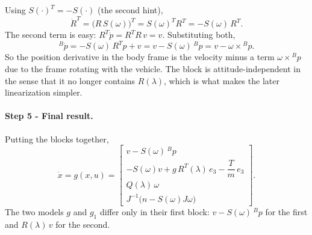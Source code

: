 Using $S(\cdot)^T = -S(\cdot)$ (the second hint),
\begin{equation*}
\dot R^T = \big(R\,S(\omega)\big)^T = S(\omega)^T R^T = -S(\omega)\, R^T .
\end{equation*}
The second term is easy: $R^T \dot p = R^T R\, v = v$.
Substituting both,
\begin{equation*}
{}^B\dot p = -S(\omega)\, R^T p + v = v - S(\omega)\, {}^B p = v - \omega \times {}^B p .
\end{equation*}
So the position derivative in the body frame is the velocity minus a term $\omega \times {}^B p$ due to the frame rotating with the vehicle.
The block is attitude-independent in the sense that it no longer contains $R(\lambda)$, which is what makes the later linearization simpler.

\paragraph{Step 5 - Final result.}
Putting the blocks together,
\begin{equation*}
\dot x = g(x, u) =
\begin{bmatrix}
v - S(\omega)\, {}^B p \\[4pt]
-S(\omega) v + g\, R^T(\lambda)\, e_3 - \dfrac{T}{m}\, e_3 \\[8pt]
Q(\lambda)\, \omega \\[4pt]
J^{-1}\big(n - S(\omega) J \omega\big)
\end{bmatrix}.
\end{equation*}
The two models $g$ and $g_1$ differ only in their first block: $v - S(\omega)\,{}^B p$ for the first and $R(\lambda)\,v$ for the second.
